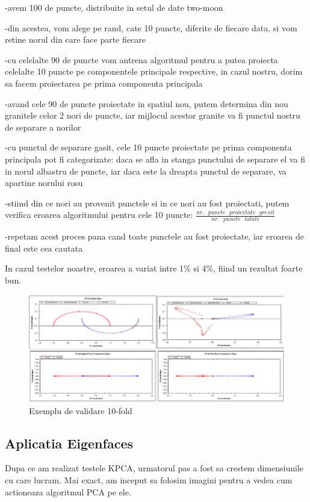 \documentclass[12pt,oneside]{article}
\begin{document}
-avem 100 de puncte, distribuite in setul de date two-moon

-din acestea, vom alege pe rand, cate 10 puncte, diferite de fiecare data, si vom retine norul din care face parte fiecare

-cu celelalte 90 de puncte vom antrena algoritmul pentru a putea proiecta celelalte 10 puncte pe componentele principale respective, in cazul nostru, dorim sa facem proiectarea pe prima componenta principala

-avand cele 90 de puncte proiectate in spatiul nou, putem determina din nou granitele celor 2 nori de puncte, iar mijlocul acestor granite va fi punctul nostru de separare a norilor

-cu punctul de separare gasit, cele 10 puncte proiectate pe prima componenta principala pot fi categorizate: daca se afla in stanga punctului de separare el va fi in norul albastru de puncte, iar daca este la dreapta punctul de separare, va apartine norului rosu

-stiind din ce nori au provenit punctele si in ce nori au fost proiectati, putem verifica eroarea algoritmului pentru cele 10 puncte: $\frac{nr. \text { } puncte \text { } proiectate \text { } gresit}{nr. \text { } puncte \text { } totale}$

-repetam acest proces pana cand toate punctele au fost proiectate, iar eroarea de final este cea cautata

In cazul testelor noastre, eroarea a variat intre 1\% si 4\%, fiind un rezultat foarte bun.

\begin{figure}[H]
\centering
\caption{Exemplu de validare 10-fold}
\includegraphics[width=\linewidth]{tenfold1}
\end{figure}

\newpage

\subsection{Aplicatia Eigenfaces}
Dupa ce am realizat testele KPCA, urmatorul pas a fost sa crestem dimensiunile cu care lucram. Mai exact, am inceput sa folosim imagini pentru a vedea cum actioneaza algoritmul PCA pe ele.
\end{document}
